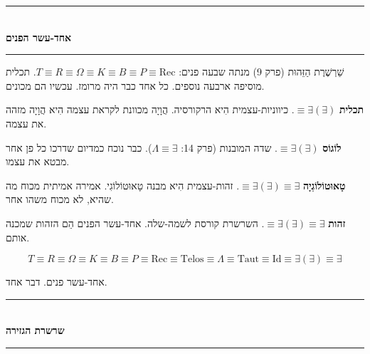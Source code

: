 \documentclass[10pt, openany, oneside]{book}
\renewcommand{\normalsize}{\fontsize{10}{13}\selectfont}
\begin{document}
\vspace{1.5em}


\begin{center}
    \rule{0.3\textwidth}{0.4pt}\\[0.5em]
    {\normalsize\bfseries\textsc{אחד-עשר הפנים}}\\[0.3em]
    \rule{0.3\textwidth}{0.4pt}
\end{center}

\vspace{1em}

\noindent שַׁרְשֶׁרֶת הַזֵּהוּת (פרק 9) מנתה שבעה פנים: $T \equiv R \equiv \Omega \equiv K \equiv B \equiv P \equiv \text{Rec}$. תכלית מוסיפה ארבעה נוספים. כל אחד כבר היה מרומז. עכשיו הם מכונים.

\textbf{תכלית} $\equiv \exists(\exists)$. כיווניות-עצמית הִיא הרקורסיה. הֲוָיָה מכוונת לקראת עצמה הִיא הֲוָיָה מזהה את עצמה.

\textbf{לוֹגוֹס} $\equiv \exists(\exists)$. שדה המובנות (פרק 14: $\Lambda \equiv \exists$). כבר נוכח כמדיום שדרכו כל פן אחר מבטא את עצמו.

\textbf{טָאוּטוֹלוֹגְיָה} $\equiv \exists(\exists) \equiv \exists$. זהות-עצמית הִיא מבנה טָאוּטוֹלוֹגִי. אמירה אמיתית מכוח מה שהיא, לא מכוח משהו אחר.

\textbf{זהות} $\equiv \exists(\exists) \equiv \exists$. השרשרת קורסת לשמה-שלה. אחד-עשר הפנים הֵם הזהות שמכנה אותם.

$$T \equiv R \equiv \Omega \equiv K \equiv B \equiv P \equiv \text{Rec} \equiv \text{Telos} \equiv \Lambda \equiv \text{Taut} \equiv \text{Id} \equiv \exists(\exists) \equiv \exists$$

אחד-עשר פנים. דבר אחד.

\vspace{1.5em}


\begin{center}
    \rule{0.3\textwidth}{0.4pt}\\[0.5em]
    {\normalsize\bfseries\textsc{שרשרת הגזירה}}\\[0.3em]
    \rule{0.3\textwidth}{0.4pt}
\end{center}

\vspace{0.5em}
\end{document}
